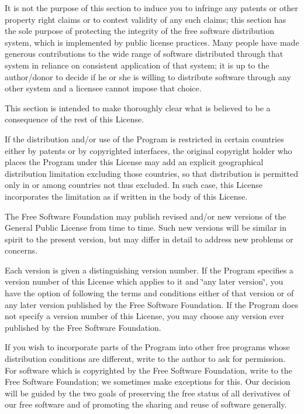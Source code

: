 It is not the purpose of this section to induce you to infringe any patents or other property right claims or to contest validity of any such claims; this section has the sole purpose of protecting the integrity of the free software distribution system, which is implemented by public license practices. Many people have made generous contributions to the wide range of software distributed through that system in reliance on consistent application of that system; it is up to the author/donor to decide if he or she is willing to distribute software through any other system and a licensee cannot impose that choice.

This section is intended to make thoroughly clear what is believed to be a consequence of the rest of this License.


\begin{DoxyEnumerate}
\item If the distribution and/or use of the Program is restricted in certain countries either by patents or by copyrighted interfaces, the original copyright holder who places the Program under this License may add an explicit geographical distribution limitation excluding those countries, so that distribution is permitted only in or among countries not thus excluded. In such case, this License incorporates the limitation as if written in the body of this License.
\item The Free Software Foundation may publish revised and/or new versions of the General Public License from time to time. Such new versions will be similar in spirit to the present version, but may differ in detail to address new problems or concerns.
\end{DoxyEnumerate}

Each version is given a distinguishing version number. If the Program specifies a version number of this License which applies to it and \char`\"{}any
later version\char`\"{}, you have the option of following the terms and conditions either of that version or of any later version published by the Free Software Foundation. If the Program does not specify a version number of this License, you may choose any version ever published by the Free Software Foundation.


\begin{DoxyEnumerate}
\item If you wish to incorporate parts of the Program into other free programs whose distribution conditions are different, write to the author to ask for permission. For software which is copyrighted by the Free Software Foundation, write to the Free Software Foundation; we sometimes make exceptions for this. Our decision will be guided by the two goals of preserving the free status of all derivatives of our free software and of promoting the sharing and reuse of software generally.
\end{DoxyEnumerate}

